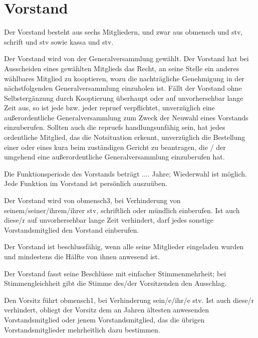 \documentclass{article}
\begin{document}
\section{Vorstand}\label{vorstand}
\begin{absatz}
    \item Der Vorstand besteht aus sechs Mitgliedern, und zwar aus \gls{obmensch} und \gls{stv}, \gls{schrift} und \gls{stv} sowie \gls{kassa} und \gls{stv}.
    \item \label{vorstand-wahl} Der Vorstand wird von der Generalversammlung gewählt. Der Vorstand hat bei Ausscheiden eines gewählten Mitglieds das Recht, an seine Stelle ein anderes wählbares Mitglied zu kooptieren, wozu die nachträgliche Genehmigung in der nächstfolgenden Generalversammlung einzuholen ist. Fällt der Vorstand ohne Selbstergänzung durch Kooptierung überhaupt oder auf unvorhersehbar lange Zeit aus, so ist jede bzw. jeder \gls{repruef} verpflichtet, unverzüglich eine außerordentliche Generalversammlung zum Zweck der Neuwahl eines Vorstands einzuberufen. Sollten auch die \glspl{repruef} handlungsunfähig sein, hat jedes ordentliche Mitglied, das die Notsituation erkennt, unverzüglich die Bestellung einer oder eines \gls{kura} beim zuständigen Gericht zu beantragen, die / der umgehend eine außerordentliche Generalversammlung einzuberufen hat.
    \item \label{vorstand-periode} Die Funktionsperiode des Vorstands beträgt
     ....  Jahre; Wiederwahl ist möglich. Jede Funktion im Vorstand ist persönlich auszuüben.
     \item Der Vorstand wird von \gls{obmensch3}, bei Verhinderung von seinem/seiner/ihrem/ihrer \gls{stv}, schriftlich oder mündlich einberufen. Ist auch diese/r auf unvorhersehbar lange Zeit verhindert, darf jedes sonstige Vorstandsmitglied den Vorstand einberufen.
     \item Der Vorstand ist beschlussfähig, wenn alle seine Mitglieder eingeladen wurden und mindestens die Hälfte von ihnen anwesend ist.
     \item Der Vorstand fasst seine Beschlüsse mit einfacher Stimmenmehrheit; bei Stimmengleichheit gibt die Stimme des/der Vorsitzenden den Ausschlag.
     \item Den Vorsitz führt \gls{obmensch1}, bei Verhinderung sein/e/ihr/e \gls{stv}. Ist auch diese/r verhindert, obliegt der Vorsitz dem an Jahren ältesten anwesenden Vorstandsmitglied oder jenem Vorstandsmitglied, das die übrigen Vorstandsmitglieder mehrheitlich dazu bestimmen.

\end{absatz}
\end{document}

